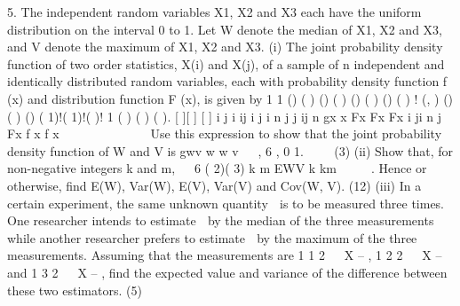 5. The independent random variables X1, X2 and X3 each have the uniform distribution on
the interval 0 to 1. Let W denote the median of X1, X2 and X3, and V denote the
maximum of X1, X2 and X3.
(i) The joint probability density function of two order statistics, X(i) and X(j), of a
sample of n independent and identically distributed random variables, each
with probability density function f (x) and distribution function F (x), is given
by
1 1
() ( ) () ( ) ()
( ) () ( )
! (, ) () ( ) () ( 1)!( 1)!( )!
1 ( ) ( ) ( ).
[ ][ ]
[ ]
i j i
ij i j i
n j
j ij
n gx x Fx Fx Fx i ji n j
Fx f x f x
  

    
 
Use this expression to show that the joint probability density function of W and
V is
gwv w w v   , 6 , 0 1.   
(3)
(ii) Show that, for non-negative integers k and m,
  6
( 2)( 3)
k m EWV
k km     .
Hence or otherwise, find E(W), Var(W), E(V), Var(V) and Cov(W, V).
(12)
(iii) In a certain experiment, the same unknown quantity  is to be measured three
times. One researcher intends to estimate  by the median of the three
measurements while another researcher prefers to estimate  by the maximum
of the three measurements. Assuming that the measurements are 1
1 2   X – ,
1
2 2   X – and 1
3 2   X – , find the expected value and variance of the
difference between these two estimators.
(5)
